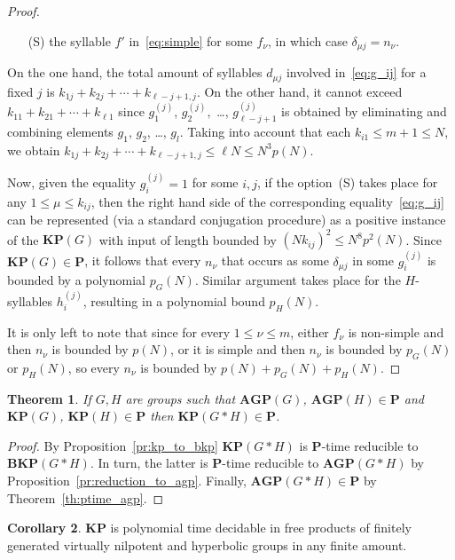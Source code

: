 \documentclass[10pt]{amsart}
\newtheorem{theorem}{Theorem}[section]
\theoremstyle{definition}
\newtheorem{corollary}[theorem]{Corollary}
\def\P{{\mathbf{P}}}
\def\BKP{{\mathbf{BKP}}}
\def\KP{{\mathbf{KP}}}
\def\AGP{{\mathbf{AGP}}}
\begin{document}
\begin{proof}
\begin{itemize}
\item[(S)]\label{li:simple} the syllable $f'$ in~\eqref{eq:simple} for some $f_\nu$, in which case $\delta_{\mu j}=n_\nu$.
\end{itemize}
On the one hand, the total amount of syllables $d_{\mu j}$ involved in~\eqref{eq:g_ij} for a fixed $j$ is $k_{1j}+k_{2j}+\cdots +k_{\ell-j+1,j}$. On the other hand, it cannot exceed $k_{11}+k_{21}+\cdots +k_{\ell 1}$
since $g_1^{(j)}$, $g_2^{(j)},$ \ldots, $g_{\ell-j+1}^{(j)}$ is obtained by eliminating and combining elements $g_1$, $g_2$, \ldots, $g_l$. Taking into account that each $k_{i1}\le m+1\le N$, we obtain $k_{1j}+k_{2j}+\cdots +k_{\ell-j+1,j}\le \ell N\le N^3p(N)$.



Now, given the equality $g_i^{(j)}=1$ for some $i,j$, if the option~(S) takes place for any $1\le \mu\le k_{ij}$, then the right hand side of the corresponding equality~\eqref{eq:g_ij} can be represented (via a standard conjugation procedure) as a positive instance of the $\KP(G)$ with input of length bounded by $(N k_{ij})^2\le N^8p^2(N)$. Since $\KP(G)\in\P$, it follows that every $n_\nu$ that occurs as some $\delta_{\mu j}$ in some $g_i^{(j)}$ is bounded by a polynomial $p_G(N)$. Similar argument takes place for the $H$-syllables $h_i^{(j)}$, resulting in a polynomial bound $p_H(N)$.

It is only left to note that since for every $1\le \nu\le m$, either $f_\nu$ is non-simple and then $n_\nu$ is bounded by $p(N)$, or it is simple and then $n_\nu$ is bounded by $p_G(N)$ or $p_H(N)$, so every $n_\nu$ is bounded by $p(N)+p_G(N)+p_H(N)$.
\end{proof}

\begin{theorem}\label{th:ptime_kp}
If $G,H$ are groups such that $\AGP(G)$, $\AGP(H)\in\P$ and $\KP(G)$, $\KP(H)\in\P$ then $\KP(G*H)\in\P$.
\end{theorem}
\begin{proof} By Proposition~\ref{pr:kp_to_bkp} $\KP(G*H)$ is $\P$-time reducible to $\BKP(G*H)$. In turn, the latter is $\P$-time reducible to $\AGP(G*H)$ by Proposition~\ref{pr:reduction_to_agp}. Finally, $\AGP(G*H)\in\P$ by Theorem~\ref{th:ptime_agp}. 
\end{proof}
\begin{corollary}
$\KP$ is polynomial time decidable in free products of finitely generated virtually nilpotent and hyperbolic groups in any finite amount.
\end{corollary}

%

\end{document}
